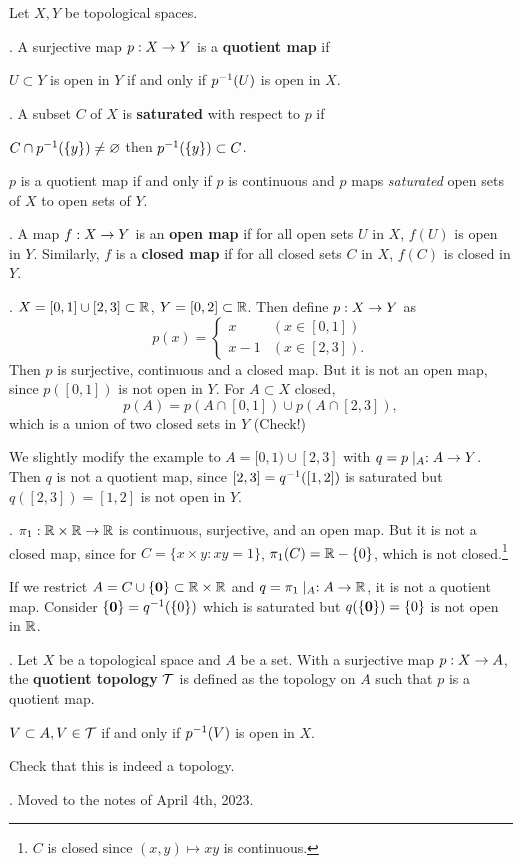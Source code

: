Let \(X, Y\) be topological spaces.

.  A surjective map \(p : X \ra Y\) is a \textbf{quotient map} if
\begin{center}
    \(U \subset Y\) is open in \(Y\) if and only if \(p\inv(U)\) is open in \(X\).
\end{center}

.  A subset \(C\) of \(X\) is \textbf{saturated} with respect to \(p\) if
\begin{center}
    \(C \cap p\inv(\{y\}) \neq \varnothing\) then \(p\inv(\{y\}) \subset C\).
\end{center}

\rmk \(p\) is a quotient map if and only if \(p\) is continuous and \(p\) maps \textit{saturated} open sets of \(X\) to open sets of \(Y\).

. A map \(f : X \ra Y\) is an \textbf{open map} if for all open sets \(U\) in \(X\), \(f(U)\) is open in \(Y\). Similarly, \(f\) is a \textbf{closed map} if for all closed sets \(C\) in \(X\), \(f(C)\) is closed in \(Y\).

\ex. \(X = [0, 1] \cup [2, 3] \subset \R\), \(Y = [0, 2] \subset \R\). Then define \(p : X \ra Y\) as
\[
    p(x) = \begin{cases}
        x & (x \in [0, 1]) \\ x - 1 & (x \in [2, 3]).
    \end{cases}
\]
Then \(p\) is surjective, continuous and a closed map. But it is not an open map, since \(p([0, 1])\) is not open in \(Y\). For \(A \subset X\) closed,
\[
    p(A) = p(A \cap [0, 1]) \cup p(A \cap [2, 3]),
\]
which is a union of two closed sets in \(Y\) (Check!)

We slightly modify the example to \(A = [0, 1) \cup [2, 3]\) with \(q = p \mid_A : A \ra Y\). Then \(q\) is not a quotient map, since \([2, 3] = q\inv([1, 2])\) is saturated but \(q([2, 3]) = [1, 2]\) is not open in \(Y\).

\ex. \(\pi_1 : \R \times \R \ra \R\) is continuous, surjective, and an open map. But it is not a closed map, since for \(C = \{x \times y : xy = 1\}\), \(\pi_1(C) = \R \bs \{0\}\), which is not closed.\footnote{\(C\) is closed since \((x, y) \mapsto xy\) is continuous.}

If we restrict \(A = C \cup \{\bf{0}\} \subset \R \times \R\) and \(q = \pi_1 \mid_A : A \ra \R\), it is not a quotient map. Consider \(\{\bf{0}\} = q\inv(\{0\})\) which is saturated but \(q(\{\bf{0}\}) = \{0\}\) is not open in \(\R\).

. Let \(X\) be a topological space and \(A\) be a set. With a surjective map \(p : X \ra A\), the \textbf{quotient topology} \(\mc{T}\) is defined as the topology on \(A\) such that \(p\) is a quotient map.
\begin{center}
    \(V \subset A, V \in \mc{T}\) if and only if \(p\inv(V)\) is open in \(X\).
\end{center}

\rmk Check that this is indeed a topology.

\ex. Moved to the notes of April 4th, 2023.

\pagebreak
